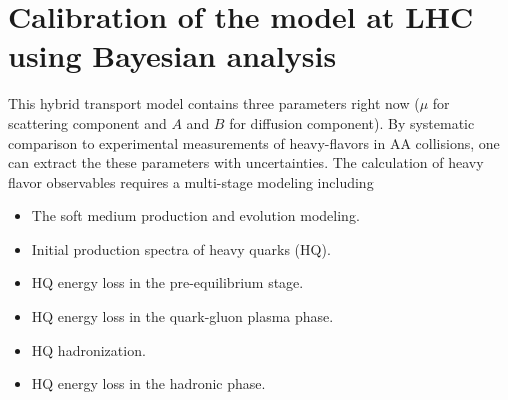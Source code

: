 \documentclass[aps, prc, reprint, amsmath, groupedaddress, nofootinbib]{revtex4-1}
\begin{document}
\section{Calibration of the model at LHC using Bayesian analysis}
This hybrid transport model contains three parameters right now ($\mu$ for scattering component and $A$ and $B$ for diffusion component).
By systematic comparison to experimental measurements of heavy-flavors in AA collisions, one can extract the these parameters with uncertainties.
The calculation of heavy flavor observables requires a multi-stage modeling including
\begin{itemize}
\item The soft medium production and evolution modeling.
\item Initial production spectra of heavy quarks (HQ).
\item HQ energy loss in the pre-equilibrium stage.
\item HQ energy loss in the quark-gluon plasma phase.
\item HQ hadronization.
\item HQ energy loss in the hadronic phase.
\end{itemize}
\end{document}
